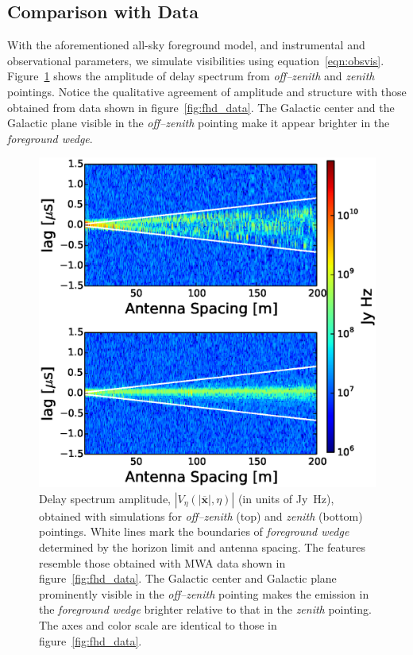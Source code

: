 \documentclass[preprint2,iop,numberedappendix]{emulateapj}
\begin{document}
\subsection{Comparison with Data}\label{sec:data-vs-model}

With the aforementioned all-sky foreground model, and instrumental and observational parameters, we simulate visibilities using equation~\ref{eqn:obsvis}. Figure~\ref{fig:sim_data} shows the amplitude of delay spectrum from {\it off--zenith} and {\it zenith} pointings. Notice the qualitative agreement of amplitude and structure with those obtained from data shown in figure~\ref{fig:fhd_data}. The Galactic center and the Galactic plane visible in the {\it off--zenith} pointing make it appear brighter in the {\it foreground wedge}. 

\begin{figure}[htb]
\centering
\includegraphics[width=\linewidth]{figures/v1_0/multi_baseline_sim_delay_spectrum_snapshots.eps}
\caption{Delay spectrum amplitude, $|V_\eta(|\overline{\mathbf{x}}|,\eta)|$ (in units of Jy~Hz), obtained with simulations for {\it off--zenith} (top) and {\it zenith} (bottom) pointings. White lines mark the boundaries of {\it foreground wedge} determined by the horizon limit and antenna spacing. The features resemble those obtained with MWA data shown in figure~\ref{fig:fhd_data}. The Galactic center and Galactic plane prominently visible in the {\it off--zenith} pointing makes the emission in the {\it foreground wedge} brighter relative to that in the {\it zenith} pointing. The axes and color scale are identical to those in figure~\ref{fig:fhd_data}. \label{fig:sim_data}}
\end{figure}
\end{document}
